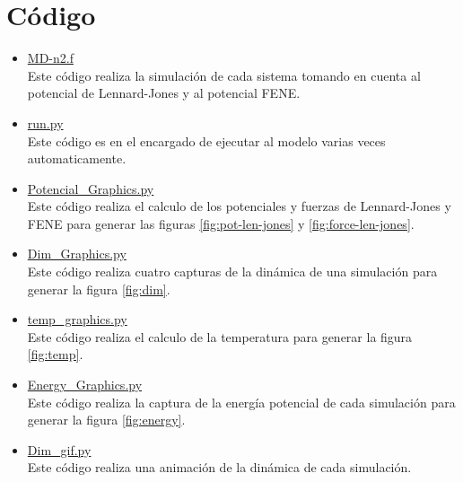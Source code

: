 \section{Código}
\begin{itemize}
    \item \href{https://github.com/giovannilopez9808/Notas_Agosto_2020/blob/master/Simulaciones/Proyecto_4/Scripts/MD-n2.f}{MD-n2.f}\\
    Este código realiza la simulación de cada sistema tomando en cuenta al potencial de Lennard-Jones y al potencial FENE.
    \item \href{https://github.com/giovannilopez9808/Notas_Agosto_2020/blob/master/Simulaciones/Proyecto_4/Scripts/run.py}{run.py}\\
    Este código es en el encargado de ejecutar al modelo varias veces automaticamente.
    \item \href{https://github.com/giovannilopez9808/Notas_Agosto_2020/blob/master/Simulaciones/Proyecto_4/Scripts/Potencial_Graphics.py}{Potencial\_Graphics.py}\\
    Este código realiza el calculo de los potenciales y fuerzas de Lennard-Jones y FENE para generar las figuras \ref{fig:pot-len-jones} y \ref{fig:force-len-jones}.
    \item \href{https://github.com/giovannilopez9808/Notas_Agosto_2020/blob/master/Simulaciones/Proyecto_4/Scripts/Dim_Graphics.py}{Dim\_Graphics.py}\\
    Este código realiza cuatro capturas de la dinámica de una simulación para generar la figura \ref{fig:dim}.
    \item \href{https://github.com/giovannilopez9808/Notas_Agosto_2020/blob/master/Simulaciones/Proyecto_4/Scripts/temp_graphics.py}{temp\_graphics.py}\\
    Este código realiza el calculo de la temperatura para generar la figura \ref{fig:temp}.
    \item \href{https://github.com/giovannilopez9808/Notas_Agosto_2020/blob/master/Simulaciones/Proyecto_4/Scripts/Energy_Graphics.py}{Energy\_Graphics.py}\\
    Este código realiza la captura de la energía potencial de cada simulación para generar la figura \ref{fig:energy}.
    \item \href{https://github.com/giovannilopez9808/Notas_Agosto_2020/blob/master/Simulaciones/Proyecto_4/Scripts/dim_gif.py}{Dim\_gif.py}\\
    Este código realiza una animación de la dinámica de cada simulación.
\end{itemize}